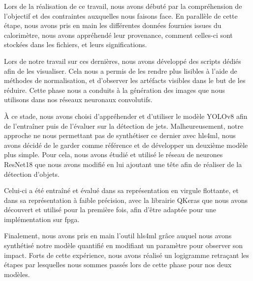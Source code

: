 Lors de la réalisation de ce travail, nous avons débuté par la compréhension de l'objectif et des contraintes auxquelles nous faisons face. En parallèle de cette étape, nous avons pris en main les différentes données fournies issues du calorimètre, nous avons appréhendé leur provenance, comment celles-ci sont stockées dans les fichiers, et leurs significations.

Lors de notre travail sur ces dernières, nous avons développé des scripts dédiés afin de les visualiser. Cela nous a permis de les rendre plus lisibles à l'aide de méthodes de normalisation, et d'observer les artéfacts visibles dans le but de les réduire. Cette phase nous a conduits à la génération des images que nous utilisons dans nos réseaux neuronaux convolutifs.

À ce stade, nous avons choisi d'appréhender et d'utiliser le modèle YOLOv8 afin de l'entraîner puis de l'évaluer sur la détection de jets. Malheureusement, notre approche ne nous permettant pas de synthétiser ce dernier avec \acrshort{hls4ml}, nous avons décidé de le garder comme référence et de développer un deuxième modèle plus simple. Pour cela, nous avons étudié et utilisé le réseau de neurones ResNet18 que nous avons modifié en lui ajoutant une tête afin de réaliser de la détection d'objets.

Celui-ci a été entraîné et évalué dans sa représentation en virgule flottante, et dans sa représentation à faible précision, avec la librairie QKeras que nous avons découvert et utilisé pour la première fois, afin d'être adaptée pour une implémentation sur \acrshort{fpga}.

Finalement, nous avons pris en main l'outil \acrshort{hls4ml} grâce auquel nous avons synthétisé notre modèle quantifié en modifiant un paramètre pour observer son impact. Forts de cette expérience, nous avons réalisé un logigramme retraçant les étapes par lesquelles nous sommes passés lors de cette phase pour nos deux modèles.

